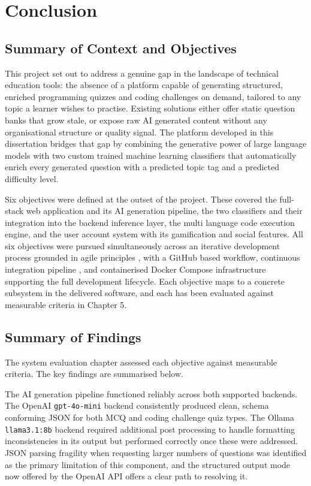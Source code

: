 \chapter{Conclusion}

\section{Summary of Context and Objectives}

This project set out to address a genuine gap in the landscape of
technical education tools: the absence of a platform capable of
generating structured, enriched programming quizzes and coding
challenges on demand, tailored to any topic a learner wishes to
practise. Existing solutions either offer static question banks that
grow stale, or expose raw AI generated content without any
organisational structure or quality signal. The platform developed in
this dissertation bridges that gap by combining the generative power
of large language models \cite{brown2020gpt3,touvron2023llama} with
two custom trained machine learning classifiers that automatically
enrich every generated question with a predicted topic tag and a
predicted difficulty level.

Six objectives were defined at the outset of the project. These
covered the full-stack web application and its AI generation pipeline,
the two classifiers and their integration into the backend inference
layer, the multi language code execution engine, and the user account
system with its gamification and social features. All six objectives
were pursued simultaneously across an iterative development process
grounded in agile principles \cite{agilemanifesto2001,beck2004xp},
with a GitHub based workflow, continuous integration pipeline
\cite{githubactions2025}, and containerised Docker Compose
infrastructure \cite{merkel2014docker,dockercompose2025} supporting
the full development lifecycle. Each objective maps to a concrete
subsystem in the delivered software, and each has been evaluated
against measurable criteria in Chapter 5.

\section{Summary of Findings}

The system evaluation chapter assessed each objective against
measurable criteria. The key findings are summarised below.

The AI generation pipeline functioned reliably across both supported
backends. The OpenAI \texttt{gpt-4o-mini} backend consistently
produced clean, schema conforming JSON for both MCQ and coding
challenge quiz types. The Ollama \texttt{llama3.1:8b} backend
required additional post processing to handle formatting
inconsistencies in its output but performed correctly once these were
addressed. JSON parsing fragility when requesting larger numbers of
questions was identified as the primary limitation of this component,
and the structured output mode now offered by the OpenAI API
\cite{openai2024structured} offers a clear path to resolving it.

